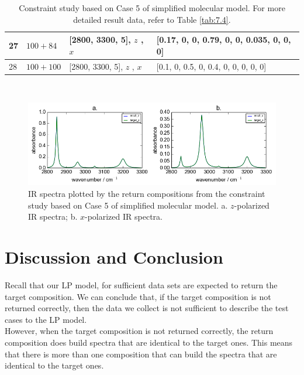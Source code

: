 \begin{table}
\begin{center}
{\begin{tabular}{| p{1cm} | p{2cm} | p{4cm}  | l |}
27 & $100 + 84$ & [2800, 3300, 5], $z$ \newline [2800, 3300, 6], $x$  & [0.17, 0, 0, 0.79, 0, 0, 0.035, 0, 0, 0] \\ \hline
28 & $100 + 100$ & [2800, 3300, 5], $z$ \newline [2800, 3300, 5], $x$  & [0.1, 0, 0.5, 0, 0.4, 0, 0, 0, 0, 0] \\ 
\hline
\end{tabular} \\
}
\caption{Constraint study based on Case 5 of simplified molecular model. For more detailed result data, refer to Table \ref{tab:7.4}.}\label{tab:3.5}
\end{center}
\end{table}

\begin{figure}[!ht] 
\centering
\includegraphics[scale=0.7]{Figures/toy_model_result_plotting_ir_sin_10candi_constraint_study_experiment5.png} 
\caption{IR spectra plotted by the return compositions from the constraint study based on Case 5 of simplified molecular model. a. $z$-polarized IR spectra; b. $x$-polarized IR spectra.}\label{fig:3.6}
\end{figure}

\section{Discussion and Conclusion}

Recall that our LP model, for sufficient data sets are expected to return the target composition. We can conclude that, if the target composition is not returned correctly, then the data we collect is not sufficient to describe the test cases to the LP model. \\

However, when the target composition is not returned correctly, the return composition does build spectra that are identical to the target ones. This means that there is more than one composition that can build the spectra that are identical to the target ones. \\

